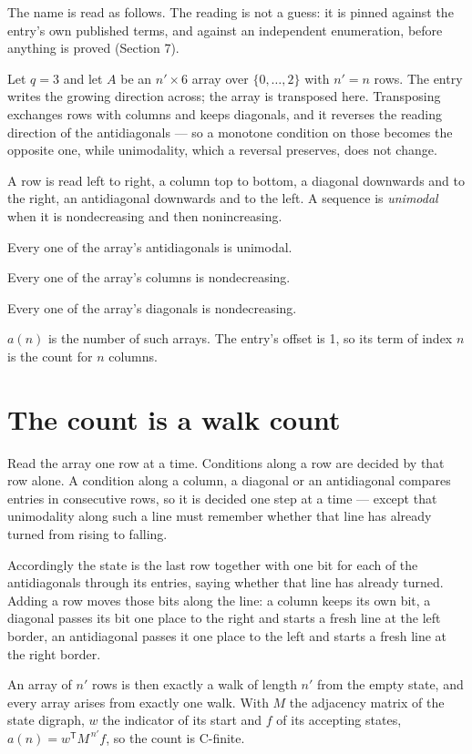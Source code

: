 \documentclass[11pt]{article}
\theoremstyle{definition}
\begin{document}
The name is read as follows. The reading is not a guess: it is pinned against the entry's own published terms, and against an independent enumeration, before anything is proved (Section 7).

Let $q = 3$ and let $A$ be an $n' \times 6$ array over $\{0,\dots,2\}$ with $n' = n$ rows. The entry writes the growing direction across; the array is transposed here. Transposing exchanges rows with columns and keeps diagonals, and it reverses the reading direction of the antidiagonals --- so a monotone condition on those becomes the opposite one, while unimodality, which a reversal preserves, does not change.

A row is read left to right, a column top to bottom, a diagonal downwards and to the right, an antidiagonal downwards and to the left. A sequence is {\itshape unimodal} when it is nondecreasing and then nonincreasing.

Every one of the array's antidiagonals is unimodal.

Every one of the array's columns is nondecreasing.

Every one of the array's diagonals is nondecreasing.

$a(n)$ is the number of such arrays. The entry's offset is 1, so its term of index $n$ is the count for $n$ columns.

\section{The count is a walk count}

Read the array one row at a time. Conditions along a row are decided by that row alone. A condition along a column, a diagonal or an antidiagonal compares entries in consecutive rows, so it is decided one step at a time --- except that unimodality along such a line must remember whether that line has already turned from rising to falling.

Accordingly the state is the last row together with one bit for each of the antidiagonals through its entries, saying whether that line has already turned. Adding a row moves those bits along the line: a column keeps its own bit, a diagonal passes its bit one place to the right and starts a fresh line at the left border, an antidiagonal passes it one place to the left and starts a fresh line at the right border.

An array of $n'$ rows is then exactly a walk of length $n'$ from the empty state, and every array arises from exactly one walk. With $M$ the adjacency matrix of the state digraph, $w$ the indicator of its start and $f$ of its accepting states, $a(n) = w^{\mathsf T}M^{\,n'}f$, so the count is C-finite.
\end{document}
